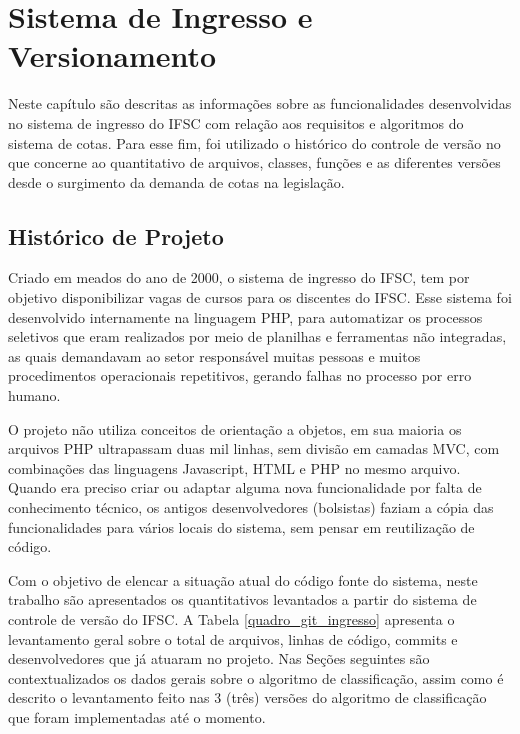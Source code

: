 \chapter{Sistema de Ingresso e Versionamento}
\label{chap:historicoversoes}

Neste capítulo são descritas as informações sobre as funcionalidades desenvolvidas no sistema de ingresso do \gls{IFSC} com relação aos requisitos e algoritmos do sistema de cotas. Para esse fim, foi utilizado o histórico do controle de versão no que concerne ao quantitativo de arquivos, classes, funções e as diferentes versões desde o surgimento da demanda de cotas na legislação.

\section{Histórico de Projeto}
\label{historicopj}
Criado em meados do ano de 2000, o sistema de ingresso do \gls{IFSC}, tem por objetivo disponibilizar vagas de cursos para os discentes do \gls{IFSC}. Esse sistema foi desenvolvido internamente na linguagem PHP, para automatizar os processos seletivos que eram realizados por meio de planilhas e ferramentas não integradas, as quais demandavam ao setor responsável muitas pessoas e muitos procedimentos operacionais repetitivos, gerando falhas no processo por erro humano.

O projeto não utiliza conceitos de orientação a objetos, em sua maioria os arquivos PHP ultrapassam duas mil linhas, sem divisão em camadas \gls{MVC}, com combinações das linguagens Javascript, HTML e PHP no mesmo arquivo. Quando era preciso criar ou adaptar alguma nova funcionalidade por falta de conhecimento técnico, os antigos desenvolvedores (bolsistas) faziam a cópia das funcionalidades para vários locais do sistema, sem pensar em reutilização de código.

Com o objetivo de elencar a situação atual do código fonte do sistema, neste trabalho são apresentados os quantitativos levantados a partir do sistema de controle de versão do \gls{IFSC}. A Tabela \ref{quadro_git_ingresso} apresenta o levantamento geral sobre o total de arquivos, linhas de código, commits e desenvolvedores que já atuaram no projeto. Nas Seções seguintes são contextualizados os dados gerais sobre o algoritmo de classificação, assim como é descrito o levantamento feito nas 3 (três) versões do algoritmo de classificação que foram implementadas até o momento.




